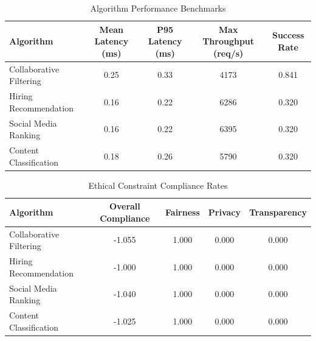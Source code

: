 \begin{table}[htbp]
\centering
\caption{Algorithm Performance Benchmarks}
\label{tab:performance}
\begin{tabular}{lcccc}
\toprule
Algorithm & Mean Latency (ms) & P95 Latency (ms) & Max Throughput (req/s) & Success Rate \\
\midrule
Collaborative Filtering & 0.25 & 0.33 & 4173 & 0.841 \\
Hiring Recommendation & 0.16 & 0.22 & 6286 & 0.320 \\
Social Media Ranking & 0.16 & 0.22 & 6395 & 0.320 \\
Content Classification & 0.18 & 0.26 & 5790 & 0.320 \\
\bottomrule
\end{tabular}
\end{table}

\begin{table}[htbp]
\centering
\caption{Ethical Constraint Compliance Rates}
\label{tab:compliance}
\begin{tabular}{lcccc}
\toprule
Algorithm & Overall Compliance & Fairness & Privacy & Transparency \\
\midrule
Collaborative Filtering & -1.055 & 1.000 & 0.000 & 0.000 \\
Hiring Recommendation & -1.000 & 1.000 & 0.000 & 0.000 \\
Social Media Ranking & -1.040 & 1.000 & 0.000 & 0.000 \\
Content Classification & -1.025 & 1.000 & 0.000 & 0.000 \\
\bottomrule
\end{tabular}
\end{table}
